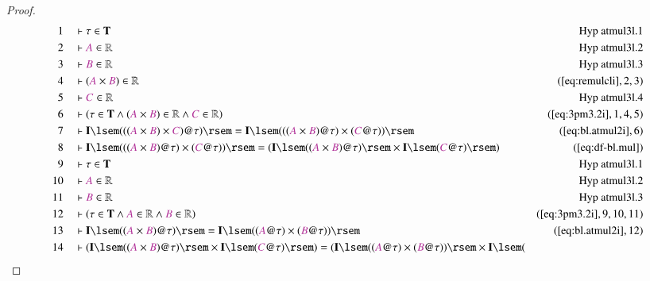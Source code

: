 \begin{proof}
\begin{align}
  1 &&  & \vdash \tau \in \mathbf{T}&\text{Hyp~atmul3l.1}\notag%
  \\ 2 &&  & \vdash \mc{A} \in
      \mathbb{R}&\text{Hyp~atmul3l.2}\notag%
  \\ 3 &&  & \vdash \mc{B} \in
      \mathbb{R}&\text{Hyp~atmul3l.3}\notag%
  \\ 4 &&  & \vdash ( \mc{A} \times \mc{B} ) \in
      \mathbb{R}&(\mbox{\ref{eq:remulcli}},2,3)\notag
  \\ 5 &&  & \vdash \mc{C} \in
      \mathbb{R}&\text{Hyp~atmul3l.4}\notag%
  \\ 6 &&  & \vdash ( \tau \in \mathbf{T} \wedge ( \mc{A} \times \mc{B} ) \in
      \mathbb{R} \wedge \mc{C} \in \mathbb{R}
      )&(\mbox{\ref{eq:3pm3.2i}},1,4,5)\notag
  \\ 7 &&  & \vdash \mathbf{I} \lsem ( ( ( \mc{A} \times \mc{B} ) \times \mc{C} )
      @ \tau ) \rsem = \mathbf{I} \lsem ( ( ( \mc{A} \times
      \mc{B} ) @ \tau ) \times ( \mc{C} @ \tau ) )
      \rsem&(\mbox{\ref{eq:bl.atmul2i}},6)\notag
  \\ 8 &&  & \vdash \mathbf{I} \lsem ( ( ( \mc{A} \times \mc{B} ) @ \tau ) \times
      ( \mc{C} @ \tau ) ) \rsem = ( \mathbf{I} \lsem ( (
      \mc{A} \times \mc{B} ) @ \tau ) \rsem \times \mathbf{I}
      \lsem ( \mc{C} @ \tau ) \rsem
      )&(\mbox{\ref{eq:df-bl.mul}})\notag
  \\ 9 &&  & \vdash \tau \in \mathbf{T}&\text{Hyp~atmul3l.1}\notag%
  \\ 10 &&  & \vdash \mc{A} \in
      \mathbb{R}&\text{Hyp~atmul3l.2}\notag%
  \\ 11 &&  & \vdash \mc{B} \in
      \mathbb{R}&\text{Hyp~atmul3l.3}\notag%
  \\ 12 &&  & \vdash ( \tau \in \mathbf{T} \wedge \mc{A} \in \mathbb{R} \wedge
      \mc{B} \in \mathbb{R}
      )&(\mbox{\ref{eq:3pm3.2i}},9,10,11)\notag
  \\ 13 &&  & \vdash \mathbf{I} \lsem ( ( \mc{A} \times \mc{B} ) @ \tau ) \rsem
      = \mathbf{I} \lsem ( ( \mc{A} @ \tau ) \times ( \mc{B}
      @ \tau ) )
      \rsem&(\mbox{\ref{eq:bl.atmul2i}},12)\notag
  \\ 14 &&  & \vdash ( \mathbf{I} \lsem ( ( \mc{A} \times \mc{B} ) @ \tau )
      \rsem \times \mathbf{I} \lsem ( \mc{C} @ \tau ) \rsem
      ) = ( \mathbf{I} \lsem ( ( \mc{A} @ \tau ) \times (
      \mc{B} @ \tau ) ) \rsem \times \mathbf{I} \lsem (

\end{align}
\end{proof}
